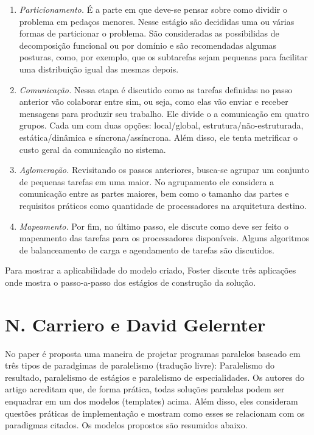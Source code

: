 \documentclass[12pt]{article}
\begin{document}
\begin{enumerate}
\item \emph{Particionamento.} É a parte em que deve-se pensar sobre como dividir 
	o problema em pedaços menores. Nesse estágio são decididas uma ou várias 
	formas de particionar o problema. São consideradas as possibilidas de decomposição
	funcional ou por domínio e são recomendadas algumas posturas, como, por exemplo,
	que os subtarefas sejam pequenas para facilitar uma distribuição igual das mesmas depois.
	
\item \emph{Comunicação.} Nessa etapa é discutido como as tarefas definidas no passo anterior 
	vão colaborar entre sim, ou seja, como elas vão enviar e receber mensagens
	para produzir seu trabalho. Ele divide o a comunicação em quatro grupos. Cada um com duas opções:
    local/global, estrutura/não-estruturada, estática/dinâmica e síncrona/assíncrona.
	Além disso, ele tenta metrificar o custo geral da comunicação no sistema.

\item \emph{Aglomeração.} Revisitando os passos anteriores, busca-se agrupar um conjunto de pequenas
	tarefas em uma maior. No agrupamento ele considera a comunicação entre as partes maiores, bem como o
	tamanho das partes e requisitos práticos como quantidade de processadores na arquitetura destino.
	
\item \emph{Mapeamento.} Por fim, no último passo, ele discute como deve ser feito o mapeamento das tarefas
	para os processadores disponíveis. Alguns algoritmos de balanceamento de carga e 
	agendamento de tarefas são discutidos. 
\end{enumerate}

Para mostrar a aplicabilidade do modelo criado, Foster discute três aplicações onde
mostra o passo-a-passo dos estágios de construção da solução.

\section{N. Carriero e David Gelernter}

No paper \cite{carriero89} é proposta uma maneira 
de projetar programas paralelos baseado em três tipos
de paradgimas de paralelismo (tradução livre): Paralelismo do resultado, paralelismo de estágios
e paralelismo de especialidades. Os autores do 
artigo acreditam que, de forma prática, todas soluções paralelas podem
ser enquadrar em um dos modelos (templates) acima. Além disso,
eles consideram questões práticas de implementação e mostram
como esses se relacionam com os paradigmas citados. Os modelos propostos
são resumidos abaixo.
\end{document}
